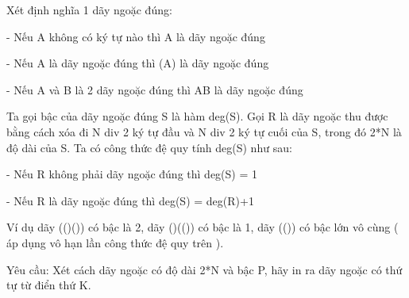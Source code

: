 Xét định nghĩa 1 dãy ngoặc đúng:   


   - Nếu A không có ký tự nào thì A là dãy ngoặc đúng   


   - Nếu A là dãy ngoặc đúng thì (A) là dãy ngoặc đúng   


   - Nếu A và B là 2 dãy ngoặc đúng thì AB là dãy ngoặc đúng   





   Ta gọi bậc của dãy ngoặc đúng S là hàm deg(S). Gọi R là dãy ngoặc thu được bằng cách xóa đi N div 2 ký tự đầu và N div 2 ký tự cuối của S, trong đó 2*N là độ dài của S. Ta có công thức đệ quy tính deg(S) như sau:   


   - Nếu R không phải dãy ngoặc đúng thì deg(S) = 1   


   - Nếu R là dãy ngoặc đúng thì deg(S) = deg(R)+1   





   Ví dụ dãy (()()) có bậc là 2, dãy ()(()) có bậc là 1, dãy (()) có bậc lớn vô cùng ( áp dụng vô hạn lần công thức đệ quy trên ).   


   Yêu cầu: Xét cách dãy ngoặc có độ dài 2*N và bậc P, hãy in ra dãy ngoặc có thứ tự từ điển thứ K.